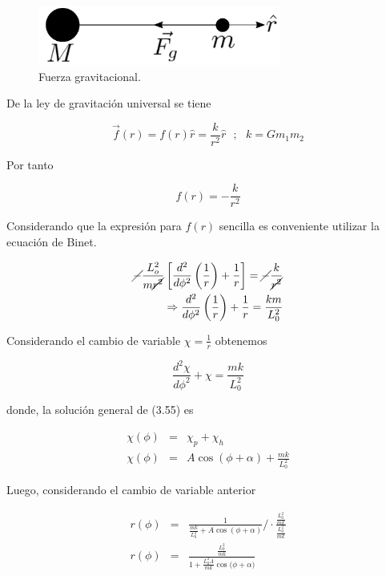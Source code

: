 \documentclass[12pt]{report}
\begin{document}
\begin{figure}[H]
	\begin{center}
	\includegraphics[width=8cm]{figura131.png} 
	\caption{ Fuerza gravitacional.}
	\label{fig.1}
	\end{center}
\end{figure}


De la ley de gravitación universal se tiene

\begin{equation}
\vec{f}(r)=f(r)\hat{r} = \frac{k}{r^2}\hat{r}  \ \ \ ; \ \ \  k = Gm_1m_2
\end{equation}

Por tanto

\begin{equation}
f(r)=-\frac{k}{r^2}
\end{equation}

Considerando que la expresión para $f(r)$ sencilla es conveniente utilizar la ecuación de Binet.

\begin{eqnarray}
\cancel{-}\frac{L_o^2}{m \cancel{r^2}} \left[ \frac{d^2}{d\phi^2} \left( \frac{1}{r} \right) + \frac{1}{r} \right]=\cancel{-}\frac{k}{\cancel{r^2}} \\
\Rightarrow \frac{d^2}{d\phi^2} \left( \frac{1}{r} \right) + \frac{1}{r} = \frac{km}{L_0^2}
\end{eqnarray}

Considerando el cambio de variable $\chi= \displaystyle\frac{1}{r}$ obtenemos

\begin{equation}
\frac{d^2\chi}{d\phi^2} + \chi = \frac{mk}{L_0^2}
\end{equation}

donde, la solución general de (3.55) es

\begin{eqnarray}
\chi(\phi) &=& \chi_p + \chi_h \\
\chi(\phi) &=& A\cos(\phi + \alpha) + \frac{mk}{L_0^2}
\end{eqnarray}

Luego, considerando el cambio de variable anterior

\begin{eqnarray}
r(\phi)&=& \frac{1}{\displaystyle\frac{mk}{L_0^2} + A\cos(\phi + \alpha)} / \cdot  \displaystyle\frac{\frac{L_0^2}{mk}}{\frac{L_0^2}{mk}} \\
r(\phi) &=& \displaystyle\frac{\displaystyle\frac{L_0^2}{mk}}{1+\displaystyle\frac{L_0^2 A}{mk} \cos{(\phi + \alpha})}
\end{eqnarray}
\end{document}
